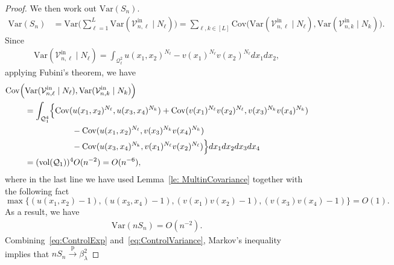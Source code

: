 \documentclass[11pt]{article}
\newcommand{\mQ}{\mathcal{Q}}
\newcommand{\vol}{\mathrm{vol}}
\newcommand{\var}{\mathrm{Var}}
\newcommand{\cov}{\mathrm{Cov}}
\newcommand{\pto}{\xrightarrow{\,\mathrm{p}\,} }
\begin{document}
\begin{proof}
    We then work out $\var(S_n)$.
    \begin{align*}
        \var(S_n) &= \var\Big(\sum_{\ell = 1}^L \var(\mathcal{V}_{n, \ell}^{\mathrm{in}}\mid N_\ell)\Big) = \sum_{\ell, k\in[L]} \cov\Big(\var(\mathcal{V}_{n, \ell}^{\mathrm{in}}\mid N_\ell), \var(\mathcal{V}_{n, k}^{\mathrm{in}}\mid N_k)\Big).
    \end{align*}
    Since 
    \begin{align*}
        \var(\mathcal{V}_{n, \ell}^{\mathrm{in}}\mid N_\ell) = \int_{\mQ_\ell^2} u(x_1, x_2)^{N_\ell} - v(x_1)^{N_\ell}v(x_2)^{N_\ell}dx_1 dx_2,
    \end{align*}
    applying Fubini's theorem, we have
    \begin{align*}
        \cov\Big(&\var(\mathcal{V}_{n, \ell}^{\mathrm{in}}\mid N_\ell), \var(\mathcal{V}_{n, k}^{\mathrm{in}}\mid N_k)\Big) \\
        &= \int_{\mQ_1^4}\Bigl\{ \cov(u(x_1, x_2)^{N_\ell}, u(x_3, x_4)^{N_k}) + \cov(v(x_1)^{N_\ell}v(x_2)^{N_\ell}, v(x_3)^{N_k}v(x_4)^{N_k}) \\
        &\hspace{2cm} - \cov(u(x_1, x_2)^{N_\ell}, v(x_3)^{N_k}v(x_4)^{N_k})\\
        &\hspace{2cm}- \cov(u(x_3, x_4)^{N_k}, v(x_1)^{N_\ell}v(x_2)^{N_\ell})\Bigr\} dx_1 dx_2 dx_3 dx_4 \\
        &= (\vol(\mQ_1))^4 O(n^{-2}) = O(n^{-6}),
    \end{align*}
where in the last line we have used Lemma~\ref{le: MultinCovariance} together with the following fact
\[
\max\{(u(x_1, x_2) - 1), (u(x_3, x_4) - 1), (v(x_1)v(x_2) - 1), (v(x_3)v(x_4) - 1)\} = O(1).
\]
As a result, we have
    \begin{align}\label{eq:ControlVariance}
        \var(nS_n) = O(n^{-2}).
    \end{align}
Combining~\eqref{eq:ControlExp} and~\eqref{eq:ControlVariance},  Markov's inequality implies that $nS_n \pto \beta_\lambda^2$


\end{proof}
\end{document}
